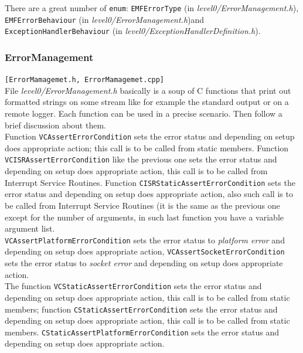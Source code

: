 There are a great number of \texttt{enum}: \texttt{EMFErrorType} (in \textit{level0/ErrorManagement.h}), \texttt{EMFErrorBehaviour} (in \textit{level0/ErrorManagement.h})and \texttt{ExceptionHandlerBehaviour} (in \textit{level0/ExceptionHandlerDefinition.h}).



\subsubsection{ErrorManagement}
\texttt{[ErrorMamagemet.h, ErrorMamagemet.cpp]}\\
File \textit{level0/ErrorManagement.h} basically is a soup of C functions that print out formatted strings on some stream like for example the standard output or on a remote logger. Each function can be used in a precise scenario. Then follow a brief discussion about them.\\


Function \texttt{VCAssertErrorCondition} sets the error status and depending on setup does appropriate action; this call is to be called from static members. Function \texttt{VCISRAssertErrorCondition} like the previous one sets the error status and depending on setup does appropriate action, this call is to be called from Interrupt Service Routines. Function \texttt{CISRStaticAssertErrorCondition} sets the error status and depending on setup does appropriate action, also such call is to be called from Interrupt Service Routines (it is the same as the previous one except for the number of arguments, in such last function you have a variable argument list.\\ 

\texttt{VCAssertPlatformErrorCondition} sets the error status to \textit{platform error} and depending on setup does appropriate action, \texttt{VCAssertSocketErrorCondition} sets the error status to \textit{socket error} and depending on setup does appropriate action.\\

The function \texttt{VCStaticAssertErrorCondition} sets the error status and depending on setup does appropriate action, this call is to be called from static members; function \texttt{CStaticAssertErrorCondition} sets the error status and depending on setup does appropriate action, this call is to be called from static members. \texttt{CStaticAssertPlatformErrorCondition} sets the error status and depending on setup does appropriate action.

